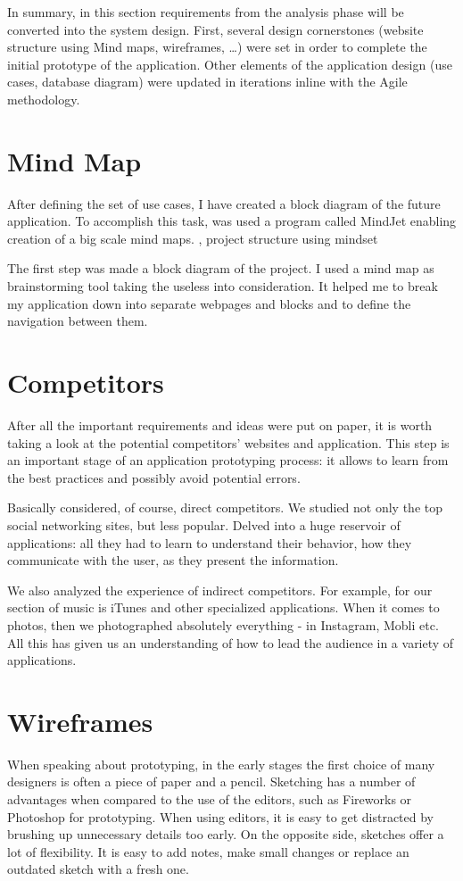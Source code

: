 In summary, in this section requirements from the analysis phase will be converted into the system design. First, several design cornerstones (website structure using Mind maps, wireframes, …) were set in order to complete the initial prototype of the application. Other elements of the application design (use cases, database diagram) were updated in iterations inline with the Agile methodology. 

\section{Mind Map}
\label{sec:mind map}
After defining the set of use cases, I have created a block diagram of the future application. To accomplish this task, was used a program called MindJet enabling creation of a big scale mind maps. , project structure using mindset 

The first step was made a block diagram of the project. I used a mind map as brainstorming tool taking the useless into consideration. It helped me to break my application down into separate webpages and blocks and to define the navigation between them. 

\section{Competitors}
\label{sec:designcompetitors}
After all the important requirements and ideas were put on paper, it is worth taking a look at the potential competitors’ websites and application. This step is an important stage of an application prototyping process: it allows to learn from the best practices and possibly avoid potential errors.

Basically considered, of course, direct competitors. We studied not only the top social networking sites, but less popular. Delved into a huge reservoir of applications: all they had to learn to understand their behavior, how they communicate with the user, as they present the information.

We also analyzed the experience of indirect competitors. For example, for our section of music is iTunes and other specialized applications. When it comes to photos, then we photographed absolutely everything - in Instagram, Mobli etc. All this has given us an understanding of how to lead the audience in a variety of applications.

\section{Wireframes}
\label{sec:wireframes}
When speaking about prototyping, in the early stages the first choice of many designers is often a piece of paper and a pencil. Sketching has a number of advantages when compared to the use of the editors, such as Fireworks or Photoshop for prototyping. When using editors, it is easy to get distracted by brushing up unnecessary details too early. On the opposite side, sketches offer a lot of flexibility. It is easy to add notes, make small changes or replace an outdated sketch with a fresh one.

